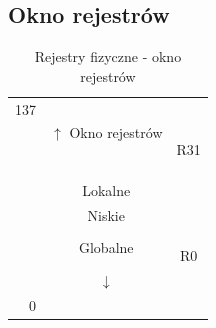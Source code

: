 	\subsection{Okno rejestrów}
	    \begin{table}[htbp]
	    	\centering
	    	\caption{Rejestry fizyczne - okno rejestrów}
	    	\begin{tabular}{r|r|r}
	    		\cline{2-2}    137   & \multirow{6}[2]{*}{$ \uparrow $ Okno rejestrów} &  \bigstrut[t]\\
	    		&       &  \\
	    		&       &  \\
	    		&       &  \bigstrut[b]\\
	    		\cline{2-2}          & \multicolumn{1}{c|}{\multirow{4}[2]{*}{Wysokie}} & \multicolumn{1}{c}{R31} \bigstrut[t]\\
	    		& \multicolumn{1}{c|}{} & \multicolumn{1}{c}{} \\
	    		& \multicolumn{1}{c|}{} & \multicolumn{1}{c}{} \\
	    		& \multicolumn{1}{c|}{} & \multicolumn{1}{c}{} \bigstrut[b]\\
	    		\cline{2-2}          & \multicolumn{1}{c|}{\multirow{4}[2]{*}{Lokalne}} & \multicolumn{1}{c}{} \bigstrut[t]\\
	    		& \multicolumn{1}{c|}{} & \multicolumn{1}{c}{} \\
	    		& \multicolumn{1}{c|}{} & \multicolumn{1}{c}{} \\
	    		& \multicolumn{1}{c|}{} & \multicolumn{1}{c}{} \bigstrut[b]\\
	    		\cline{2-2}          & \multicolumn{1}{c|}{\multirow{4}[2]{*}{Niskie}} & \multicolumn{1}{c}{} \bigstrut[t]\\
	    		& \multicolumn{1}{c|}{} & \multicolumn{1}{c}{} \\
	    		& \multicolumn{1}{c|}{} & \multicolumn{1}{c}{} \\
	    		& \multicolumn{1}{c|}{} & \multicolumn{1}{c}{} \bigstrut[b]\\
	    		\cline{2-2}          & \multicolumn{1}{c|}{\multirow{4}[2]{*}{Globalne}} & \multicolumn{1}{c}{} \bigstrut[t]\\
	    		& \multicolumn{1}{c|}{} & \multicolumn{1}{c}{} \\
	    		& \multicolumn{1}{c|}{} & \multicolumn{1}{c}{} \\
	    		& \multicolumn{1}{c|}{} & \multicolumn{1}{c}{R0} \bigstrut[b]\\
	    		\cline{2-2}          & \multicolumn{1}{c|}{\multirow{2}[2]{*}{$ \downarrow $ }} &  \bigstrut[t]\\
	    		& \multicolumn{1}{c|}{} &  \\
	    		0     & \multicolumn{1}{c|}{} &  \bigstrut[b]\\
	    		\cline{2-2}
	    	\end{tabular}%
	    	\label{tab:addlabel}%
	    	\vspace{-2cm}
	    \end{table}
	    
